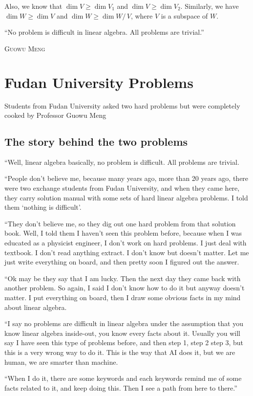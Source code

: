 \documentclass[
	11pt, %
	fleqn, %
	a4paper, %
]{LegrandOrangeBook}
\newcommand{\quotient}[2]{#1 /\, #2} %
\let\originalepigraph\epigraph
\renewcommand\epigraph[2]{\originalepigraph{#1}{\textsc{#2}}}
\begin{document}
Also, we know that $\dim{V} \geq \dim{V_1}$ and $\dim{V} \geq \dim{V_2}$. Similarly, we have $\dim{W} \geq \dim{V}$ and $\dim{W} \geq \dim{\quotient{W}{V}}$, where $V$ is a subspace of $W$.

\newpage

\epigraph{``No problem is difficult in linear algebra. All problems are trivial.''}{Guowu Meng}

\section{Fudan University Problems}

Students from Fudan University asked two hard problems but were completely cooked by Professor Guowu Meng

\subsection{The story behind the two problems}
``Well, linear algebra basically, no problem is difficult. All problems are trivial. 

``People don't believe me, because many years ago, more than 20 years ago, there were two exchange students from Fudan University, and when they came here, they carry solution manual with some sets of hard linear algebra problems. I told them `nothing is difficult'. 

``They don't believe me, so they dig out one hard problem from that solution book. Well, I told them I haven't seen this problem before, because when I was educated as a physicist engineer, I don't work on hard problems. I just deal with textbook. I don't read anything extract. I don't know but doesn't matter. Let me just write everything on board, and then pretty soon I figured out the answer. 

``Ok may be they say that I am lucky. Then the next day they came back with another problem. So again, I said I don't know how to do it but anyway doesn't matter. I put everything on board, then I draw some obvious facts in my mind about linear algebra. 

``I say no problems are difficult in linear algebra under the assumption that you know linear algebra inside-out, you know every facts about it. Usually you will say I have seen this type of problems before, and then step 1, step 2 step 3, but this is a very wrong way to do it. This is the way that AI does it, but we are human, we are smarter than machine. 

``When I do it, there are some keywords and each keywords remind me of some facts related to it, and keep doing this. Then I see a path from here to there.'' 
\end{document}
